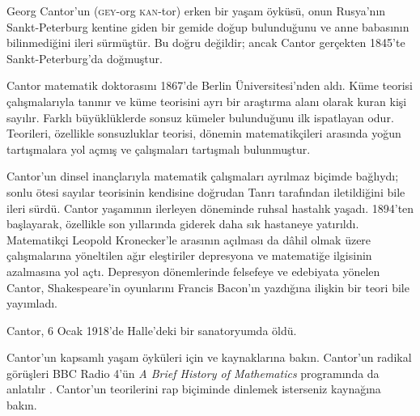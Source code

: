 




Georg Cantor'un (\textsc{gey}-org \textsc{kan}-tor) erken bir yaşam
öyküsü, onun Rusya'nın Sankt-Peterburg kentine giden bir gemide doğup
bulunduğunu ve anne babasının bilinmediğini ileri sürmüştür. Bu doğru
değildir; ancak Cantor gerçekten 1845'te Sankt-Peterburg'da doğmuştur.

Cantor matematik doktorasını 1867'de Berlin Üniversitesi'nden aldı. Küme
teorisi çalışmalarıyla tanınır ve küme teorisini ayrı bir araştırma alanı
olarak kuran kişi sayılır. Farklı büyüklüklerde sonsuz kümeler bulunduğunu
ilk ispatlayan odur. Teorileri, özellikle sonsuzluklar teorisi, dönemin
matematikçileri arasında yoğun tartışmalara yol açmış ve çalışmaları
tartışmalı bulunmuştur.

Cantor'un dinsel inançlarıyla matematik çalışmaları ayrılmaz biçimde
bağlıydı; sonlu ötesi sayılar teorisinin kendisine doğrudan Tanrı tarafından
iletildiğini bile ileri sürdü. Cantor yaşamının ilerleyen döneminde ruhsal
hastalık yaşadı. 1894'ten başlayarak, özellikle son yıllarında giderek daha
sık hastaneye yatırıldı. Matematikçi Leopold Kronecker'le arasının açılması
da dâhil olmak üzere çalışmalarına yöneltilen ağır eleştiriler depresyona
ve matematiğe ilgisinin azalmasına yol açtı. Depresyon dönemlerinde
felsefeye ve edebiyata yönelen Cantor, Shakespeare'in oyunlarını Francis
Bacon'ın yazdığına ilişkin bir teori bile yayımladı.

Cantor, 6 Ocak 1918'de Halle'deki bir sanatoryumda öldü.

\begin{reading}
Cantor'un kapsamlı yaşam öyküleri için \citet{Dauben1990} ve
\citet{Grattan-Guinness1971} kaynaklarına bakın. Cantor'un radikal
görüşleri BBC Radio 4'ün \emph{A Brief History of Mathematics} programında
da anlatılır \citep{Sautoy2014}. Cantor'un teorilerini rap biçiminde
dinlemek isterseniz \citet{Rose2012} kaynağına bakın.
\end{reading}

